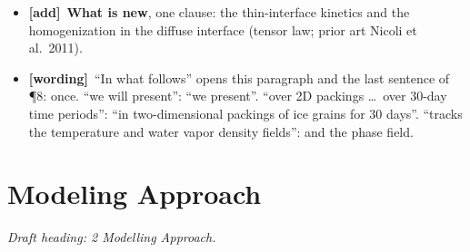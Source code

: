 \documentclass[11pt]{article}
\newcommand{\tG}{\textcolor{stale}{\textbf{[wording]}}\ }
\newcommand{\tA}{\textcolor{have}{\textbf{[add]}}\ }
\begin{document}
\begin{enumerate}
\begin{itemize}
    dimensions, temperatures a laboratory can reach.
  \item \tA \textbf{What is new}, one clause: the thin-interface kinetics and
    the homogenization in the diffuse interface (tensor law; prior art
    Nicoli et al.\ 2011).
  \item \tG ``In what follows'' opens this paragraph and the last sentence of
    \P8: once. ``we will present'': ``we present''. ``over 2D packings
    \ldots\ over 30-day time periods'': ``in two-dimensional packings of ice
    grains for 30 days''. ``tracks the temperature and water vapor density
    fields'': and the phase field.
  \end{itemize}
\end{enumerate}

\section{Modeling Approach}
\textit{Draft heading: 2 Modelling Approach.}
\end{document}
